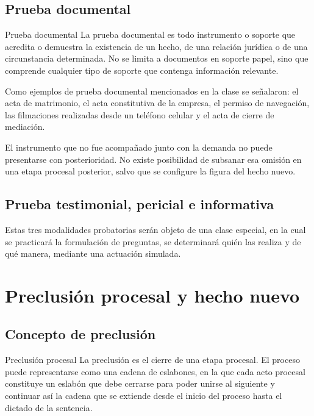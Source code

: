 \documentclass[12pt,oneside]{book}
\begin{document}
\section{Prueba documental}

\begin{definition}{Prueba documental}
La prueba documental es todo instrumento o soporte que acredita o demuestra la existencia de un hecho, de una relación jurídica o de una circunstancia determinada. No se limita a documentos en soporte papel, sino que comprende cualquier tipo de soporte que contenga información relevante.
\end{definition}

Como ejemplos de prueba documental mencionados en la clase se señalaron: el acta de matrimonio, el acta constitutiva de la empresa, el permiso de navegación, las filmaciones realizadas desde un teléfono celular y el acta de cierre de mediación.

\begin{important}
El instrumento que no fue acompañado junto con la demanda no puede presentarse con posterioridad. No existe posibilidad de subsanar esa omisión en una etapa procesal posterior, salvo que se configure la figura del hecho nuevo.
\end{important}

\section{Prueba testimonial, pericial e informativa}

\begin{note}
Estas tres modalidades probatorias serán objeto de una clase especial, en la cual se practicará la formulación de preguntas, se determinará quién las realiza y de qué manera, mediante una actuación simulada.
\end{note}

\chapter{Preclusión procesal y hecho nuevo}

\section{Concepto de preclusión}

\begin{definition}{Preclusión procesal}
La preclusión es el cierre de una etapa procesal. El proceso puede representarse como una cadena de eslabones, en la que cada acto procesal constituye un eslabón que debe cerrarse para poder unirse al siguiente y continuar así la cadena que se extiende desde el inicio del proceso hasta el dictado de la sentencia.
\end{definition}
\end{document}
